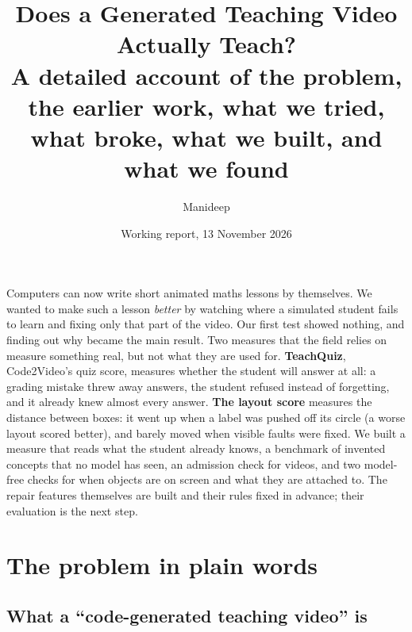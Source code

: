 \documentclass[11pt]{article}
\title{Does a Generated Teaching Video Actually Teach?\\[4pt]
\large A detailed account of the problem, the earlier work, what we tried, what broke, what we built, and what we
found}
\author{Manideep}
\date{Working report, 13 November 2026}
\begin{document}
\maketitle

\begin{inshort}
Computers can now write short animated maths lessons by themselves. We wanted to make such a lesson \emph{better} by
watching where a simulated student fails to learn and fixing only that part of the video. Our first test showed
nothing, and finding out why became the main result. Two measures that the field relies on measure something real,
but not what they are used for. \textbf{TeachQuiz}, Code2Video's quiz score, measures whether the student will answer at all: a grading
mistake threw away answers, the student refused instead of forgetting, and it already knew almost every answer.
\textbf{The layout score} measures the distance between boxes: it went up when a label was pushed off its circle (a worse
layout scored better), and barely moved when \ClaudeFaults{} visible faults were fixed. We built a measure that reads what the student already knows, a
benchmark of invented concepts that no model has seen, an admission check for videos, and two model-free checks for when
objects are on screen and what they are attached to. The repair features themselves are built and their rules fixed in advance;
their evaluation is the next step.
\end{inshort}



\tableofcontents
\newpage

\section{The problem in plain words}

\subsection{What a ``code-generated teaching video'' is}
\end{document}
